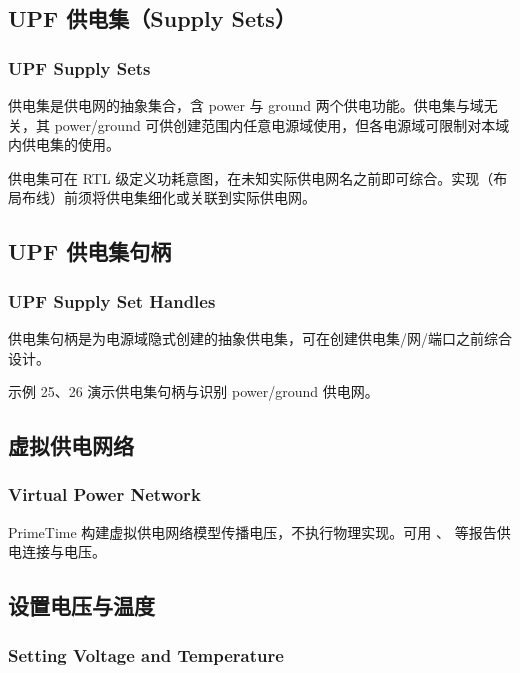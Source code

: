 \subsection{UPF 供电集（Supply Sets）}
\subsubsection*{UPF Supply Sets}

供电集是供电网的抽象集合，含 power 与 ground 两个供电功能。供电集与域无关，其 power/ground 可供创建范围内任意电源域使用，但各电源域可限制对本域内供电集的使用。

供电集可在 RTL 级定义功耗意图，在未知实际供电网名之前即可综合。实现（布局布线）前须将供电集细化或关联到实际供电网。

\subsection{UPF 供电集句柄}
\subsubsection*{UPF Supply Set Handles}

供电集句柄是为电源域隐式创建的抽象供电集，可在创建供电集/网/端口之前综合设计。


示例 25、26 演示供电集句柄与识别 power/ground 供电网。

\subsection{虚拟供电网络}
\subsubsection*{Virtual Power Network}

PrimeTime 构建虚拟供电网络模型传播电压，不执行物理实现。可用 、 等报告供电连接与电压。

\subsection{设置电压与温度}
\subsubsection*{Setting Voltage and Temperature}

